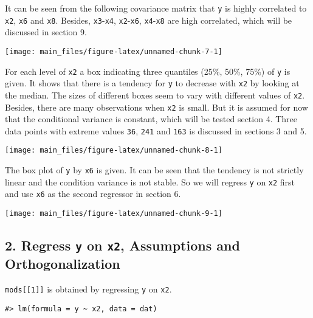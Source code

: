 It can be seen from the following covariance matrix that \texttt{y} is
highly correlated to \texttt{x2}, \texttt{x6} and \texttt{x8}. Besides,
\texttt{x3}-\texttt{x4}, \texttt{x2}-\texttt{x6},
\texttt{x4}-\texttt{x8} are high correlated, which will be discussed in
section 9.

\begin{center}\texttt{[image: main\_files/figure-latex/unnamed-chunk-7-1]} \end{center}

For each level of \texttt{x2} a box indicating three quantiles (25\%,
50\%, 75\%) of \texttt{y} is given. It shows that there is a tendency
for \texttt{y} to decrease with \texttt{x2} by looking at the median.
The sizes of different boxes seem to vary with different values of
\texttt{x2}. Besides, there are many observations when \texttt{x2} is
small. But it is assumed for now that the conditional variance is
constant, which will be tested section 4. Three data points with extreme
values \texttt{36}, \texttt{241} and \texttt{163} is discussed in
sections 3 and 5.

\begin{center}\texttt{[image: main\_files/figure-latex/unnamed-chunk-8-1]} \end{center}

The box plot of \texttt{y} by \texttt{x6} is given. It can be seen that
the tendency is not strictly linear and the condition variance is not
stable. So we will regress \texttt{y} on \texttt{x2} first and use
\texttt{x6} as the second regressor in section 6.

\begin{center}\texttt{[image: main\_files/figure-latex/unnamed-chunk-9-1]} \end{center}

\hypertarget{regress-y-on-x2-assumptions-and-orthogonalization}{%
\subsection{\texorpdfstring{2. Regress \texttt{y} on \texttt{x2},
Assumptions and
Orthogonalization}{2. Regress y on x2, Assumptions and Orthogonalization}}\label{regress-y-on-x2-assumptions-and-orthogonalization}}

\texttt{mods{[}{[}1{]}{]}} is obtained by regressing \texttt{y} on
\texttt{x2}.

\begin{verbatim}
#> lm(formula = y ~ x2, data = dat)
\end{verbatim}

